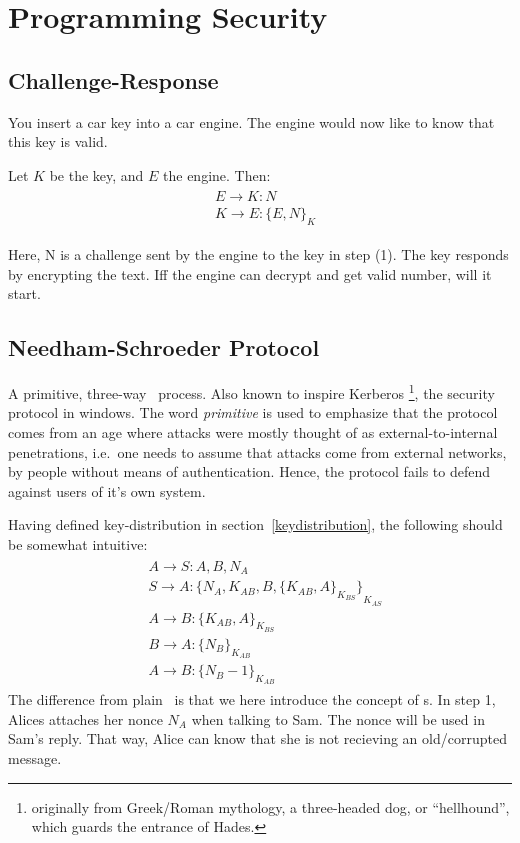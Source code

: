\section{Programming Security}

\subsection{Challenge-Response}\label{chalres}
You insert a car key into a car engine. The engine would now like to know
that this key is valid.

Let $K$ be the key, and $E$ the engine. Then:
\begin{gather}
    \begin{align}
        &E \rightarrow K: N \\
        &K \rightarrow E: {\{E, N\}}_{K}
    \end{align}
\end{gather}

Here, N is a challenge sent by the engine to the key in step (1).
The key responds by encrypting the text. Iff the engine can decrypt
and get valid number, will it start.


\subsection{Needham-Schroeder Protocol}
A primitive, three-way~ process. Also known
to inspire Kerberos%
\footnote{originally from Greek/Roman mythology, a three-headed dog, or ``hellhound'',
    which guards the entrance of Hades.},
the security protocol in windows. The word \textit{primitive} is used to 
emphasize that the protocol comes from an age where attacks were
mostly thought of as external-to-internal penetrations, i.e.\
one needs to assume that attacks come from external networks,
by people without means of authentication. Hence, the protocol
fails to defend against users of it's own system.

Having defined key-distribution in section~\ref{keydistribution}, the following should 
be somewhat intuitive:
\setcounter{equation}{0}
\begin{gather}
    \begin{align}
        &A \rightarrow S: A,B,N_{A}  \\
        &S \rightarrow A: {{\{N_A, K_{AB}, B, \{K_{AB}, A\}}_{K_{BS}}\}}_{K_{AS}} \\ 
        &A \rightarrow B: \{K_{AB}, A\}_{K_{BS}} \\ 
        &B \rightarrow A: \{N_B\}_{K_{AB}} \\
        &A \rightarrow B: \{N_B-1\}_{K_{AB}}
    \end{align}
\end{gather}
The difference from plain~ is that we here introduce the
concept of \nameref{nonce}s.
In step 1, Alices attaches her nonce $N_{A}$ when talking to Sam.
The nonce will be used in Sam's reply. That way, Alice can know that
she is not recieving an old/corrupted message.

